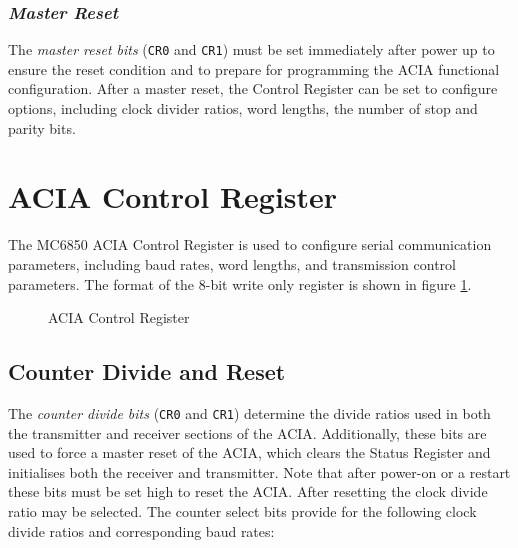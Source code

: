 \documentclass[a4paper,11pt,twoside,openright]{report}
\renewcommand{\arraystretch}{1.1}
\newcommand{\code}{\texttt}
\begin{document}
\subsubsection*{\textit{Master Reset}}
The \textit{master reset bits} (\code{CR0} and \code{CR1}) must be set immediately after power up to ensure the reset condition and to prepare for programming the ACIA functional configuration. After a master reset, the Control Register can be set to configure options, including clock divider ratios, word lengths, the number of stop and parity bits.

\section*{ACIA Control Register}
The MC6850 ACIA Control Register is used to configure serial communication parameters, including baud rates, word lengths, and transmission control parameters. The format of the 8-bit write only register is shown in figure \ref{fig:control}.

\begin{figure}[H]
\renewcommand{\arraystretch}{1.2}
\centering
{}
\caption{ACIA Control Register}
\label{fig:control}
\end{figure}

\subsection*{Counter Divide and Reset}
The \textit{counter divide bits} (\code{CR0} and \code{CR1}) determine the divide ratios used in both the transmitter and receiver sections of the ACIA. Additionally, these bits are used to force a master reset of the ACIA, which clears the Status Register and initialises both the receiver and transmitter. Note that after power-on or a restart these bits must be set high to reset the ACIA. After resetting the clock divide ratio may be selected. The counter select bits provide for the following clock divide ratios and corresponding baud rates:
\end{document}

